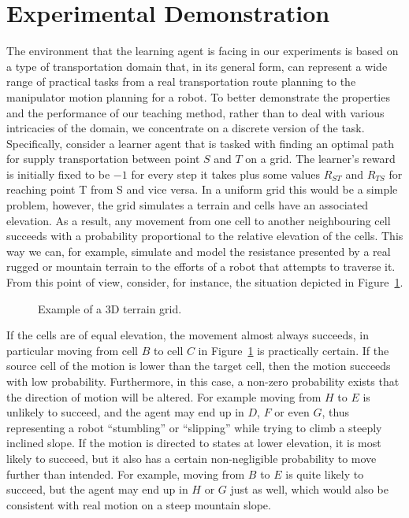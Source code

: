 \section{Experimental Demonstration}\label{sec: experiments}
\noindent
The environment that the learning agent is facing in our experiments
is based on a type of transportation domain that, in its general form,
can represent a wide range of practical tasks from a real
transportation route planning to the manipulator motion planning for a
robot. To better demonstrate the properties and the performance of our
teaching method, rather than to deal with various intricacies of the
domain, we concentrate on a discrete version of the
task. Specifically, consider a learner agent that is tasked with
finding an optimal path for supply transportation between point $S$
and $T$ on a grid. The learner's reward is initially fixed to be $-1$
for every step it takes plus some values $R_{ST}$ and $R_{TS}$ for
reaching point T from S and vice versa. In a uniform grid this would
be a simple problem, however, the grid simulates a terrain and cells
have an associated elevation.  As a result, any movement from one cell
to another neighbouring cell succeeds with a probability proportional
to the relative elevation of the cells. This way we can, for example,
simulate and model the resistance presented by a real rugged or
mountain terrain to the efforts of a robot that attempts to traverse
it. From this point of view, consider, for instance, the situation
depicted in Figure~\ref{exp_motion}.

\begin{figure}[ht]
\centerline{}
\caption{\label{exp_motion}Example of a 3D terrain grid.}
\end{figure}

If the cells are of equal elevation, the movement almost always
succeeds, in particular moving from cell $B$ to cell $C$ in
Figure~\ref{exp_motion} is practically certain. If the source cell of
the motion is lower than the target cell, then the motion succeeds
with low probability. Furthermore, in this case, a non-zero
probability exists that the direction of motion will be
altered. For example moving from $H$ to $E$ is unlikely to succeed, and the
agent may end up in $D$, $F$ or even $G$, thus representing a robot
``stumbling'' or ``slipping'' while trying to climb a steeply inclined
slope. If the motion is directed to states at lower elevation, it is most
likely to succeed, but it also has a certain non-negligible
probability to move further than intended. For example,  moving from $B$ to $E$
is quite likely to succeed, but the agent may end up in $H$ or $G$
just as well, which would also be consistent with  real motion on a
steep mountain slope.

